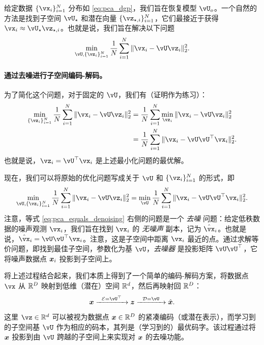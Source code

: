 \documentclass[../../book-main.tex]{subfiles}
\begin{document}
给定数据 \(\{\vx_{i}\}_{i = 1}^{N}\) 分布如 \eqref{eq:pca_dgp}，我们旨在恢复模型 \(\vU_{o}\)。一个自然的方法是找到子空间 \(\vU_{\star}\) 和潜在向量 \(\{\vz_{\star, i}\}_{i = 1}^{N}\)，它们最接近于获得 \(\vx_{i} \approx \vU_{\star}\vz_{\star, i}\)。也就是说，我们旨在解决以下问题
\begin{equation}\label{eq:pca_sparse_recovery_problem}
    \min_{\vU, \{\vz_{i}\}_{i = 1}^{N}}\frac{1}{N}\sum_{i = 1}^{N}\norm{\vx_{i} - \vU\vz_{i}}_{2}^{2}.
\end{equation}

\paragraph{通过去噪进行子空间编码-解码。}
为了简化这个问题，对于固定的 \(\vU\)，我们有（证明作为练习）：
\begin{align*}
    \min_{\{\vz_{i}\}_{i = 1}^{N}}\frac{1}{N}\sum_{i = 1}^{N}\norm{\vx_{i} - \vU\vz_{i}}_{2}^{2} 
    &= \frac{1}{N}\sum_{i = 1}^{N}\min_{\vz_{i}}\norm{\vx_{i} - \vU\vz_{i}}_{2}^{2} \\
    &= \frac{1}{N}\sum_{i = 1}^{N}\norm{\vx_{i} - \vU\vU^{\top}\vx_{i}}_{2}^{2}. 
\end{align*}
也就是说，\(\vz_i = \vU^\top\vx_i\) 是上述最小化问题的最优解。

现在，我们可以将原始的优化问题写成关于 \(\vU\) 和 \(\{\vz_{i}\}_{i = 1}^{N}\) 的形式，即
\begin{equation}\label{eq:pca_equals_denoising}
    \min_{\vU, \{\vz_{i}\}_{i = 1}^{N}}\frac{1}{N}\sum_{i = 1}^{N}\norm{\vx_{i} - \vU\vz_{i}}_{2}^{2} = \min_{\vU}\frac{1}{N}\sum_{i = 1}^{N}\norm{\vx_{i} - \vU\vU^{\top}\vx_{i}}_{2}^{2}.
\end{equation}
注意，等式 \eqref{eq:pca_equals_denoising} 右侧的问题是一个 \textit{去噪} 问题：给定低秩数据的噪声观测 \(\vx_{i}\)，我们旨在找到 \(\vx_{i}\) 的 \textit{无噪声} 副本，记为 $\hat{\vx}_i$。也就是说，$\hat{\vx}_i = \vU\vU^\top \vx_i$。注意，这是子空间中距离 $\vx_i$ 最近的点。通过求解等价问题，即找到最佳子空间，参数化为基 \(\vU\)，\textit{去噪器} 是投影矩阵 \(\vU\vU^{\top}\)，它将噪声数据点 $\bm{x}_i$ 投影到子空间上。%

将上述过程结合起来，我们本质上得到了一个简单的编码-解码方案，将数据点 $\vx$ 从 $\mathbb{R}^D$ 映射到低维（潜在）空间 $\mathbb{R}^d$，然后再映射回 $\mathbb{R}^D$：
\begin{equation}
\x \xrightarrow{\hspace{2mm} \mathcal{E} = \vU^\top \hspace{2mm}}  \z \xrightarrow{\hspace{2mm} \mathcal{D} = \vU \hspace{2mm}}   \hat{\x}.  
\label{eqn:autoencoding-PCA}
\end{equation}
这里 $\vz \in \R^d$ 可以被视为数据点  $\bm{x} \in \mathbb{R}^D$ 的紧凑编码（或潜在表示），而学习到的子空间基 $\vU$ 作为相应的码本，其列是（学习到的）最优码字。该过程通过将 $\bm{x}$ 投影到由 $\vU$ 跨越的子空间上来实现对 $\bm{x}$ 的去噪功能。
\end{document}
